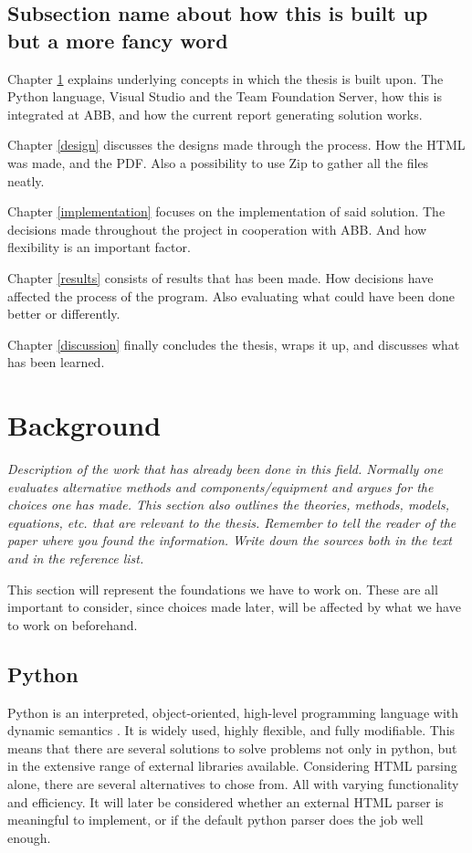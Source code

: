 \documentclass{article}
\begin{document}
	
	\subsection{Subsection name about how this is built up but a more fancy word}
	Chapter \ref{background} explains underlying concepts in which the thesis is built upon. The Python language, Visual Studio and the Team Foundation Server, how this is integrated at ABB, and how the current report generating solution works.
	
	Chapter \ref{design} discusses the designs made through the process. How the HTML was made, and the PDF. Also a possibility to use Zip to gather all the files neatly. 
	
	Chapter \ref{implementation} focuses on the implementation of said solution. The decisions made throughout the project in cooperation with ABB. And how flexibility is an important factor.
	
	Chapter \ref{results} consists of results that has been made. How decisions have affected the process of the program. Also evaluating what could have been done better or differently. 
	
	Chapter \ref{discussion} finally concludes the thesis, wraps it up, and discusses what has been 
	learned. 
	
	\pagebreak
	
	\section{Background} \label{background}
	
	\em Description of the work that has already been done in this field. Normally one
	evaluates alternative methods and components/equipment and argues for the choices one has
	made. This section also outlines the theories, methods, models, equations, etc. that are
	relevant to the thesis. Remember to tell the reader of the paper where you found the
	information. Write down the sources both in the text and in the reference list. \em
	
	This section will represent the foundations we have to work on. These are all important to consider, since choices made later, will be affected by what we have to work on beforehand. 
	
	\subsection{Python}
	Python is an interpreted, object-oriented, high-level programming language with dynamic semantics \cite{aboutpython}. It is widely used, highly flexible, and fully modifiable. This means that there are several solutions to solve problems not only in python, but in the extensive range of external libraries available. Considering HTML parsing alone, there are several alternatives to chose from. All with varying functionality and efficiency. It will later be considered whether an external HTML parser is meaningful to implement, or if the default python parser does the job well enough. 
	
\end{document}
